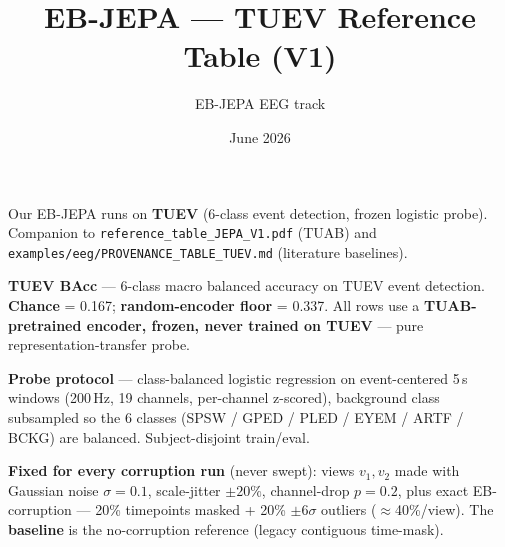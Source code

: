 \documentclass[10pt,a4paper]{article}
\title{\textbf{EB-JEPA --- TUEV Reference Table (V1)}}
\author{EB-JEPA EEG track}
\date{June 2026}
\begin{document}
\maketitle

\noindent Our EB-JEPA runs on \textbf{TUEV} (6-class event detection, frozen logistic probe).
Companion to \texttt{reference\_table\_JEPA\_V1.pdf} (TUAB) and
\texttt{examples/eeg/PROVENANCE\_TABLE\_TUEV.md} (literature baselines).

\bigskip


\bigskip

\noindent\textbf{TUEV BAcc} --- 6-class macro balanced accuracy on TUEV event detection.
\textbf{Chance} = 0.167; \textbf{random-encoder floor} = 0.337. All rows use a
\textbf{TUAB-pretrained encoder, frozen, never trained on TUEV} --- pure
representation-transfer probe.

\medskip

\noindent\textbf{Probe protocol} --- class-balanced logistic regression on event-centered 5\,s
windows (200\,Hz, 19 channels, per-channel z-scored), background class subsampled so the 6 classes
(SPSW / GPED / PLED / EYEM / ARTF / BCKG) are balanced. Subject-disjoint train/eval.

\medskip

\noindent\textbf{Fixed for every corruption run} (never swept): views $v_1,v_2$ made with Gaussian
noise $\sigma=0.1$, scale-jitter $\pm20\%$, channel-drop $p=0.2$, plus exact EB-corruption ---
20\% timepoints masked + 20\% $\pm6\sigma$ outliers ($\approx$40\%/view). The \textbf{baseline} is
the no-corruption reference (legacy contiguous time-mask).

\medskip
\end{document}
